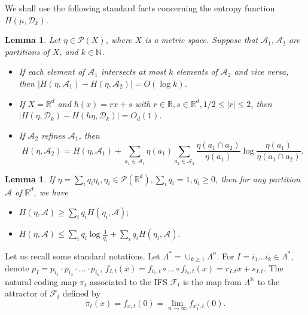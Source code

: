 \documentclass[a4paper,11pt]{amsart}
\newtheorem{lemma}[theorem]{Lemma}
\theoremstyle{definition}
\numberwithin{equation}{section}
\def\to{\rightarrow}
\def\D{\mathcal{D}}
\def\cP{\mathcal P}
\def\F{\mathcal F}
\def\N{\mathbb N}
\def\R{\mathbb R}
\begin{document}
We shall use the following standard facts concerning the entropy function $H(\mu,\D_k)$. 
\begin{lemma}\label{lemma:almost-continuity-entropy:1}
Let $\eta\in \cP(X)$, where $X$ is a metric space.   Suppose that  $\mathcal{A}_1,\mathcal{A}_2$ are partitions of $X$,  and $k\in \N$.
\begin{itemize}
\item[(1)] If each element of $\mathcal{A}_1$ intersects at most $k$ elements of $\mathcal{A}_2$ and vice versa, then 
$\left| H(\eta,\mathcal{A}_1)-H(\eta,\mathcal{A}_2) \right|=O(\log k)$.
\item[(2)] If  $X=\R^d$ and  $h(x)=rx+s$ with $r\in \R, s\in \R^d, 1/2\le |r|\le 2$,  then $\left| H(\eta,\D_k)-H(h\eta,\D_k) \right|=O_d(1)$.
\item[(3)] If $\mathcal{A}_2$ refines $\mathcal{A}_1$,  then 
\[H(\eta,\mathcal{A}_2) = H(\eta,\mathcal{A}_1)+\sum_{a_1\in \mathcal{A}_1}\eta(a_1)\sum_{a_2\in \mathcal{A}_2}\frac{\eta(a_1\cap a_2)}{\eta(a_1)}\log  \frac{\eta(a_1)}{\eta(a_1\cap a_2)}.  \] 
\end{itemize}
\end{lemma}

\begin{lemma}\label{lemma:convexity-entropy:1}
If $\eta=\sum_{i}q_i\eta_i,  \eta_i\in \cP(\R^d),\sum_iq_i=1, q_i\ge 0$, then for any partition $\mathcal{A}$ of $\R^d$,  we have
\begin{itemize}
\item[(1)]
$
H(\eta,\mathcal{A})\ge \sum_i q_i H(\eta_i,\mathcal{A});
$
\item[(2)]
$
H(\eta,\mathcal{A})\le \sum_{i}q_i\log \frac{1}{q_i}+ \sum_i q_i H(\eta_i,\mathcal{A}).
$
\end{itemize}
\end{lemma}

Let us recall some standard notations.   Let $\Lambda^*=\cup_{k\ge 1}\Lambda^n$.   For $I=i_1\ldots i_k\in \Lambda^*$,  denote $p_I=p_{i_1}\cdot p_{i_2}\cdot  \ldots \cdot p_{i_k}$,  $f_{I,t}(x)=f_{i_1,t}\circ \ldots \circ f_{i_k,t}(x)=r_{I,t}x+s_{I,t}.$ The natural coding map $\pi_t$ associated to the IFS $\F_t$ is the map from $\Lambda^\N$ to the attractor of $\F_t$ defined by 
\[
\pi_t(x)=f_{x,t}(0)=\lim_{n\to \infty} f_{x_1^n,t}(0).
\]
\end{document}

